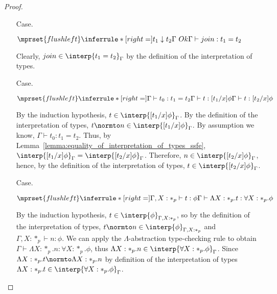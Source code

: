 \begin{proof}
\begin{itemize}
\item[Case.]\ \\
  \begin{center}
    \begin{math}
      $$\mprset{flushleft}
      \inferrule* [right=] {
        t_1 \downarrow t_2
	\\
	\Gamma\ Ok
      }{\Gamma \vdash join : t_1 = t_2}
    \end{math}
  \end{center}
  Clearly, $join \in \interp{t_1 = t_2}_\Gamma$ by the definition of the 
  interpretation of types.
  
\item[Case.]\ \\
  \begin{center}
    \begin{math}
      $$\mprset{flushleft}
      \inferrule* [right=] {
        \Gamma \vdash t_0:t_1 = t_2
        \\
        \Gamma \vdash t:[t_1/x]\phi
      }{\Gamma \vdash t:[t_2/x]\phi}
    \end{math}
  \end{center}
  By the induction hypothesis, $t \in \interp{[t_1/x]\phi}_\Gamma$.
  By the definition of the interpretation of types, $t \normto n \in
  \interp{[t_1/x]\phi}_\Gamma$.  By assumption we know, $\Gamma \vdash
  t_0:t_1 = t_2$. Thus, by
  Lemma~\ref{lemma:equality_of_interpretation_of_types_ssfe},
  $\interp{[t_1/x]\phi}_\Gamma = \interp{[t_2/x]\phi}_\Gamma$.
  Therefore, $n \in \interp{[t_2/x]\phi}_\Gamma$, hence, by the
  definition of the interpretation of types, $t \in
  \interp{[t_2/x]\phi}_\Gamma$.
  
\item[Case.]\ \\
  \begin{center}
    \begin{math}
      $$\mprset{flushleft}
      \inferrule* [right=] {
        \Gamma, X : *_p \vdash t : \phi
      }{\Gamma \vdash \Lambda X:*_p.t:\forall X:*_p.\phi}
    \end{math}
  \end{center}
  By the induction hypothesis, $t \in \interp{\phi}_{\Gamma,X:*_p}$, so
  by the definition of the interpretation of types, $t \normto n \in
  \interp{\phi}_{\Gamma,X:*_p}$ and $\Gamma,X:*_p \vdash n:\phi$.
  We can apply the $\Lambda$-abstraction type-checking rule to
  obtain $\Gamma \vdash \Lambda X:*_p.n:\forall X:*_p.\phi$, thus
  $\Lambda X:*_p.n \in \interp{\forall X:*_p.\phi}_{\Gamma}$.  Since
  $\Lambda X:*_p.t \normto \Lambda X:*_p.n$ by definition of the
  interpretation of types 
  $\Lambda X:*_p.t \in \interp{\forall X:*_p.\phi}_{\Gamma}$.


\end{itemize}
\end{proof}

